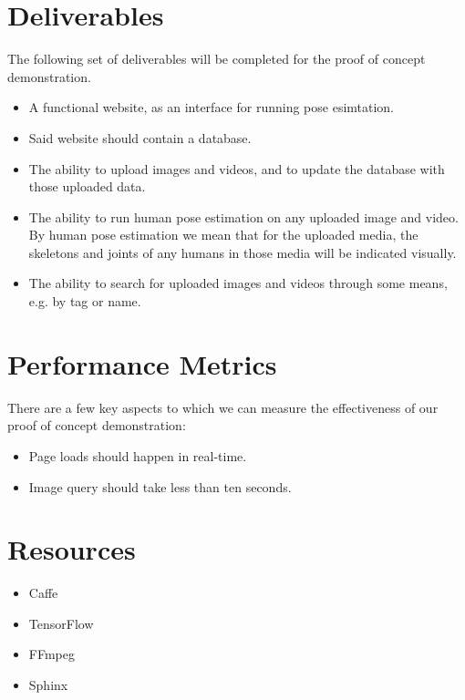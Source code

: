 \documentclass[a4paper, 12pt]{article}
\begin{document}
\section{Deliverables}
{
The following set of deliverables will be completed for the proof of concept
demonstration.

\begin{itemize}
        \item A functional website, as an interface for running pose esimtation.
        \item Said website should contain a database.
        \item The ability to upload images and videos, and to update the
                database with those uploaded data.
        \item The ability to run human pose estimation on any uploaded image
                and video. By human pose estimation we mean that for the
                uploaded media, the skeletons and joints of any humans in those
                media will be indicated visually.
        \item The ability to search for uploaded images and videos through some
                means, e.g. by tag or name.
\end{itemize}
}

\section{Performance Metrics}
There are a few key aspects to which we can measure the effectiveness of our
proof of concept demonstration:

\begin{itemize}
        \item Page loads should happen in real-time.
        \item Image query should take less than ten seconds.
\end{itemize}

\section{Resources}
\begin{itemize}
    \item Caffe
    \item TensorFlow
    \item FFmpeg
    \item Sphinx 
\end{itemize}
\end{document}
